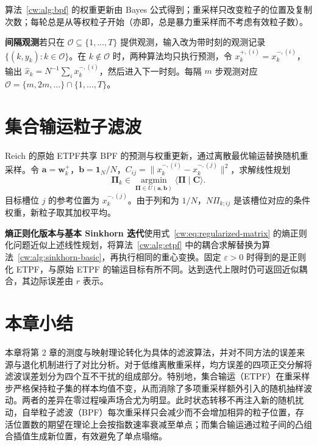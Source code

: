 算法~\ref{cw:alg:bpf} 的权重更新由 Bayes 公式得到；重采样只改变粒子的位置及复制次数；每轮总是从等权粒子开始（亦即，总是暴力重采样而不考虑有效粒子数）。

\textbf{间隔观测}\enspace 若只在 $\mathcal O\subseteq\{1,\dots,T\}$ 提供观测，输入改为带时刻的观测记录 $\{(k,y_k):k\in\mathcal O\}$。在 $k\notin\mathcal O$ 时，两种算法均只执行预测，令 $x_k^{+,(i)}=x_k^{-,(i)}$，输出 $\hat x_k=N^{-1}\sum_i x_k^{-,(i)}$，然后进入下一时刻。每隔 $m$ 步观测对应 $\mathcal O=\{m,2m,\dots\}\cap\{1,\dots,T\}$。


\section{集合输运粒子滤波}\label{cw:sec:alg-etpf}
Reich 的原始 ETPF\cite{reich2013nonparametric}共享 BPF 的预测与权重更新，通过离散最优输运替换随机重采样。令 $\bm a=\bm w_k^+$，$\bm b=\mathbf1_N/N$，$C_{ij}=\|x_k^{-,(i)}-x_k^{-,(j)}\|^2$，求解线性规划
\begin{equation}\label{cw:eq:algorithm-etpf-original}
\bm\Pi_k\in\operatorname*{argmin}_{\bm\Pi\in U(\bm a,\bm b)}\langle\bm\Pi\mid\bm C\rangle.
\end{equation}
目标槽位 $j$ 的参考位置为 $x_k^{-,(j)}$。由于列和为 $1/N$，$N\Pi_{k;ij}$ 是该槽位对应的条件权重，新粒子取其加权平均。



\textbf{熵正则化版本与基本 Sinkhorn 迭代}\enspace 使用式~\eqref{cw:eq:regularized-matrix} 的熵正则化问题\cite{cuturi2013sinkhorn}近似上述线性规划，将算法~\ref{cw:alg:etpf} 中的耦合求解替换为算法~\ref{cw:alg:sinkhorn-basic}，再执行相同的重心变换。固定 $\varepsilon>0$ 时得到的是正则化 ETPF，与原始 ETPF 的输运目标有所不同。达到迭代上限时仍可返回近似耦合，其边际误差由 $r$ 表示。






\section{本章小结}

本章将第 2 章的测度与映射理论转化为具体的滤波算法，并对不同方法的误差来源与退化机制进行了对比分析。对于低维离散重采样，均方误差的四项正交分解将滤波误差划分为四个互不干扰的组成部分。特别地，集合输运（ETPF）在重采样步严格保持粒子集的样本均值不变，从而消除了多项重采样额外引入的随机抽样波动。两者的差异在零过程噪声场合尤为明显。此时状态转移不再注入新的随机扰动，自举粒子滤波（BPF）每次重采样只会减少而不会增加相异的粒子位置，存活位置数的期望在理论上会按指数速率衰减至单点；而集合输运通过粒子间的凸组合插值生成新位置，有效避免了单点塌缩。

